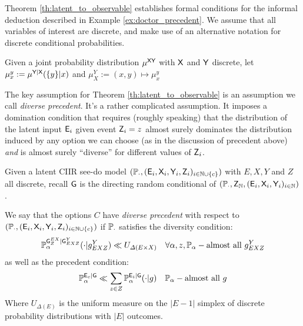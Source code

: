Theorem \ref{th:latent_to_observable} establishes formal conditions for the informal deduction described in Example \ref{ex:doctor_precedent}. We assume that all variables of interest are discrete, and make use of an alternative notation for discrete conditional probabilities.

\begin{definition}
Given a joint probability distribution $\mu^{\mathsf{XY}}$ with $\mathsf{X}$ and $\mathsf{Y}$ discrete, let $\mu^y_x:=\mu^{\mathsf{Y}|\mathsf{X}}(\{y\}|x)$ and $\mu^Y_X:= (x,y)\mapsto \mu^y_x$
\end{definition}

The key assumption for Theorem \ref{th:latent_to_observable} is an assumption we call \emph{diverse precedent}. It's a rather complicated assumption. It imposes a domination condition that requires (roughly speaking) that the distribution of the latent input $\mathsf{E}_i$ given event $\mathsf{Z}_i=z$ almost surely dominates the distribution induced by any option we can choose (as in the discussion of precedent above) \emph{and} is almost surely ``diverse'' for different values of $\mathsf{Z}_i$.

\begin{definition}\label{def:diverse_precedent}
Given a latent CIIR see-do model $(\mathbb{P}_\cdot,(\mathsf{E}_i,\mathsf{X}_i,\mathsf{Y}_i,\mathsf{Z}_i)_{i\in\mathbb{N}\cup\{c\}})$ with $E,X,Y$ and $Z$ all discrete, recall $\mathsf{G}$ is the directing random conditional of $(\mathbb{P}_\cdot,\mathsf{Z}_{\mathbb{N}},(\mathsf{E}_i,\mathsf{X}_i,\mathsf{Y}_i)_{i\in \mathbb{N}})$. 

We say that the options $C$ have \emph{diverse precedent} with respect to $(\mathbb{P}_\cdot,(\mathsf{E}_i,\mathsf{X}_i,\mathsf{Y}_i,\mathsf{Z}_i)_{i\in\mathbb{N}\cup\{c\}})$ if $\mathbb{P}_\cdot$ satisfies the diversity condition:
\begin{align}
    \mathbb{P}_{\alpha}^{\mathsf{G}^{EX}_{Z}|\mathsf{G}^{Y}_{EXZ}}(\cdot|g^{Y}_{EXZ}) &\ll U_{\Delta(E\times X)}& \forall \alpha, z, \mathbb{P}_\alpha-\text{almost all }g^{Y}_{EXZ}\label{eqApp:lebesgue_dom}
\end{align}
as well as the precedent condition:
\begin{align}
    \mathbb{P}_\alpha^{\mathsf{E}_c|\mathsf{G}} &\ll \sum_{z\in Z}\mathbb{P}_\alpha^{\mathsf{E}_i|\mathsf{G}}(\cdot|g)&\mathbb{P}_\alpha-\text{almost all }g
\end{align}
Where $U_{\Delta(E)}$ is the uniform measure on the $|E-1|$ simplex of discrete probability distributions with $|E|$ outcomes.
\end{definition}

